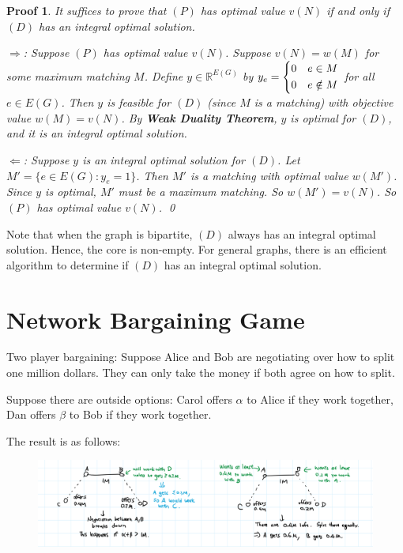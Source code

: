 \documentclass[twoside]{article}
\newtheorem{protoproof}[prototheorem]{Proof}
\renewenvironment{proof}
{\colorlet{shadecolor}{blue!15}\begin{shaded}\begin{protoproof}
		\normalfont}
		{\qed\end{protoproof}\end{shaded}}
\begin{document}
\begin{proof}
	It suffices to prove that $(P)$ has optimal value $v(N)$ if and only if $(D)$ has an integral optimal solution. 
		
	$\Rightarrow$: Suppose $(P)$ has optimal value $v(N)$. Suppose $v(N) = w(M)$ for some maximum matching $M$. Define $y \in \mathbb{R}^{E(G)}$ by $y_e = \begin{dcases}
	0 & e \in M \\ 0 & e \notin M
	\end{dcases}$ for all $e \in E(G)$. Then $y$ is feasible for $(D)$ (since $M$ is a matching) with objective value $w(M) = v(N)$. By \textbf{Weak Duality Theorem}, $y$ is optimal for $(D)$, and it is an integral optimal solution. 
	
	$\Leftarrow$: Suppose $y$ is an integral optimal solution for $(D)$. Let $M' = \{e \in E(G) : y_e = 1\}$. Then $M'$ is a matching with optimal value $w(M')$. Since $y$ is optimal, $M'$ must be a maximum matching. So $w(M') = v(N)$. So $(P)$ has optimal value $v(N)$. 
\end{proof}

Note that when the graph is bipartite, $(D)$ always has an integral optimal solution. Hence, the core is non-empty. For general graphs, there is an efficient algorithm to determine if $(D)$ has an integral optimal solution. 

\section{Network Bargaining Game}

Two player bargaining: Suppose Alice and Bob are negotiating over how to split one million dollars. They can only take the money if both agree on how to split. 

Suppose there are outside options: Carol offers $\alpha$ to Alice if they work together, Dan offers $\beta$ to Bob if they work together. 

The result is as follows: 
\begin{center}
	\begin{figure}[h!]
		\includegraphics[width=\textwidth]{Network_Bargaining_game.png}
	\end{figure}
\end{center}
\end{document}
